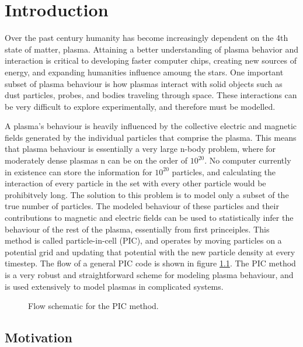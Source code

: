 
\chapter{Introduction}
\label{ch:introduction}
	Over the past century humanity has become increasingly dependent on the 4th state of matter, plasma. Attaining a better understanding of plasma behavior and interaction is critical to developing faster computer chips, creating new sources of energy, and expanding humanities influence amoung the stars. One important subset of plasma behaviour is how plasmas interact with solid objects such as dust particles, probes, and bodies traveling through space. These interactions can be very difficult to explore experimentally, and therefore must be modelled. 
	
A plasma's behaviour is heavily influenced by the collective electric and magnetic fields generated by the individual particles that comprise the plasma. This means that plasma behaviour is essentially a very large n-body problem, where for moderately dense plasmas n can be on the order of $10^{20}$. No computer currently in existence can store the information for $10^{20}$ particles, and calculating the interaction of every particle in the set with every other particle would be prohibitvely long. The solution to this problem is to model only a subset of the true number of particles. The modeled behaviour of these particles and their contributions to magnetic and electric fields can be used to statistically infer the behaviour of the rest of the plasma, essentially from first princeiples. This method is called particle-in-cell (PIC), and operates by moving particles on a potential grid and updating that potential with the new particle density at every timestep. The flow of a general PIC code is shown in figure \ref{fig:pic_flowchart}. The PIC method is a very robust and straightforward scheme for modeling plasma behaviour, and is used extensively to model plasmas in complicated systems.

\begin{figure}
\begin{center}

\end{center}
\caption{Flow schematic for the PIC method.}
\label{fig:pic_flowchart}
\end{figure}


	\section{Motivation}

